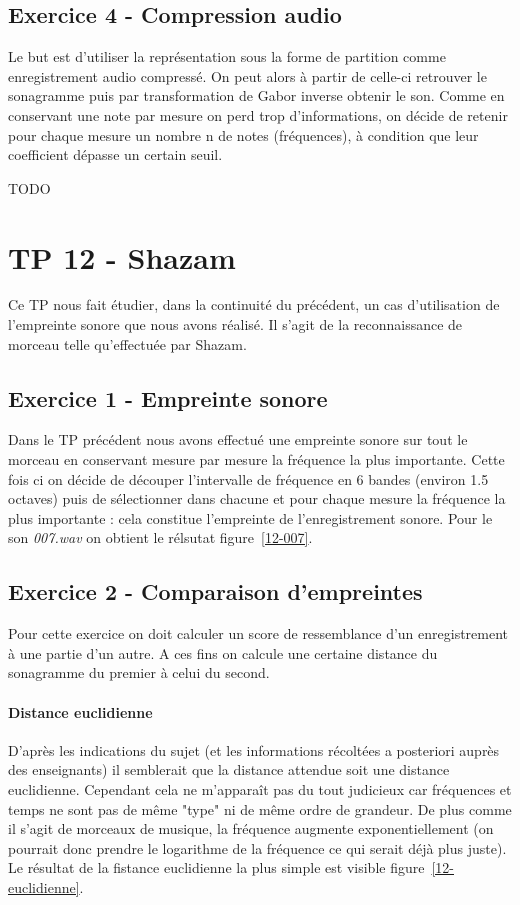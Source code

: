 \documentclass{article}
\begin{document}
\subsection{Exercice 4 - Compression audio}
Le but est d'utiliser la représentation sous la forme de partition comme enregistrement audio compressé. On peut alors à partir de celle-ci retrouver le sonagramme puis par transformation de Gabor inverse obtenir le son. Comme en conservant une note par mesure on perd trop d'informations, on décide de retenir pour chaque mesure un nombre n de notes (fréquences), à condition que leur coefficient dépasse un certain seuil.

TODO


\section{TP 12 - Shazam}
Ce TP nous fait étudier, dans la continuité du précédent, un cas
d'utilisation de l'empreinte sonore que nous avons réalisé. Il s'agit
de la reconnaissance de morceau telle qu'effectuée par Shazam.

\subsection{Exercice 1 - Empreinte sonore}
Dans le TP précédent nous avons effectué une empreinte sonore sur tout le
morceau en conservant mesure par mesure la fréquence la plus importante.
Cette fois ci on décide de découper l'intervalle de fréquence en 6 bandes
(environ 1.5 octaves) puis de sélectionner dans chacune et pour chaque
mesure la fréquence la plus importante : cela constitue l'empreinte de
l'enregistrement sonore. Pour le son \emph{007.wav} on obtient le
rélsutat figure~\ref{12-007}.

\begin{figure}
\end{figure}

\subsection{Exercice 2 - Comparaison d'empreintes}
Pour cette exercice on doit calculer un score de ressemblance d'un
enregistrement à une partie d'un autre. A ces fins on calcule une
certaine distance du sonagramme du premier à celui du second.

\paragraph{Distance euclidienne}
D'après les indications du sujet (et les informations récoltées a
posteriori auprès des enseignants) il semblerait que la distance
attendue soit une distance euclidienne. Cependant cela ne m'apparaît
pas du tout judicieux car fréquences et temps ne sont pas de même
"type" ni de même ordre de grandeur. De plus comme il s'agit de
morceaux de musique, la fréquence augmente exponentiellement (on
pourrait donc prendre le logarithme de la fréquence ce qui serait déjà
plus juste). Le résultat de la fistance euclidienne la plus simple est
visible figure~\ref{12-euclidienne}.
\end{document}
